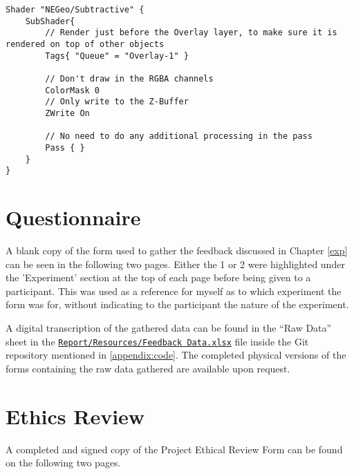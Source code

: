 		\begin{lstlisting}[caption="Render Cull Shader - Subtractive.shader", label=appendix:code:shader]
Shader "NEGeo/Subtractive" {
	SubShader{
		// Render just before the Overlay layer, to make sure it is rendered on top of other objects
		Tags{ "Queue" = "Overlay-1" }

		// Don't draw in the RGBA channels
		ColorMask 0
		// Only write to the Z-Buffer
		ZWrite On

		// No need to do any additional processing in the pass
		Pass { }
	}
}
		\end{lstlisting}

\newpage
	\section{Questionnaire}
	\label{appendix:question}
		A blank copy of the form used to gather the feedback discussed in Chapter \ref{exp} can be seen in the following two pages. Either the 1 or 2 were highlighted under the 'Experiment' section at the top of each page before being given to a participant. This was used as a reference for myself as to which experiment the form was for, without indicating to the participant the nature of the experiment.

		A digital transcription of the gathered data can be found in the \enquote{Raw Data} sheet in the \href{https://github.com/nboxhallburnett/IndividualProject/blob/master/Report/Resources/Feedback\%20Data.xlsx?raw=true}{\texttt{Report/Resources/Feedback Data.xlsx}} file inside the Git repository mentioned in \autoref{appendix:code}.
		The completed physical versions of the forms containing the raw data gathered are available upon request.

		

\newpage
	\section{Ethics Review}
	\label{appendix:ethics}
		A completed and signed copy of the Project Ethical Review Form can be found on the following two pages.

		
